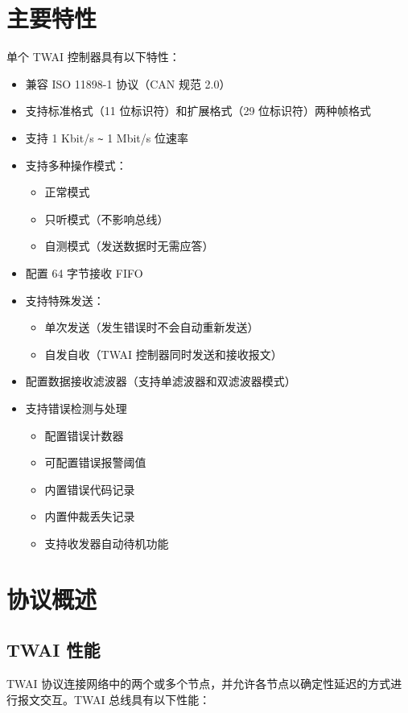 \documentclass[main\_\_CN.tex]{subfiles}
\begin{document}
\section{主要特性}
\chipname{} 单个 TWAI 控制器具有以下特性：
\begin{itemize}
    \item 兼容 ISO 11898-1 协议（CAN 规范 2.0）
    \item 支持标准格式（11 位标识符）和扩展格式（29 位标识符）两种帧格式
    \item 支持 1 Kbit/s \verb+~+ 1 Mbit/s 位速率
    \item 支持多种操作模式：
    \begin{itemize}
        \item 正常模式
        \item 只听模式（不影响总线）
        \item 自测模式（发送数据时无需应答）
    \end{itemize}
    \item 配置 64 字节接收 FIFO
    \item 支持特殊发送：
    \begin{itemize}
        \item 单次发送（发生错误时不会自动重新发送）
        \item 自发自收（TWAI 控制器同时发送和接收报文）
    \end{itemize}
    \item 配置数据接收滤波器（支持单滤波器和双滤波器模式）
    \item 支持错误检测与处理  
    \begin{itemize}
        \item 配置错误计数器
        \item 可配置错误报警阈值
        \item 内置错误代码记录
        \item 内置仲裁丢失记录
    \end{itemize}
    \begin{itemize}
        \item 支持收发器自动待机功能
    \end{itemize}
\end{itemize}

\section{协议概述}
\label{sec:twai-functional-protocol}
\subsection{TWAI 性能}
TWAI 协议连接网络中的两个或多个节点，并允许各节点以确定性延迟的方式进行报文交互。TWAI 总线具有以下性能：
\end{document}
